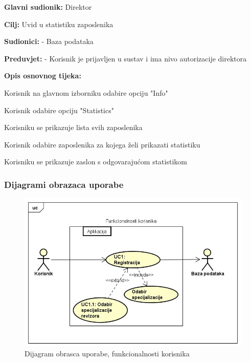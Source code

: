 					\noindent {}
						\begin{packed_item}
		
							\item \textbf{Glavni sudionik:} Direktor
							\item  \textbf{Cilj:} Uvid u statistiku zaposlenika
							\item  \textbf{Sudionici:} - Baza podataka
							\item  \textbf{Preduvjet:} - Korisnik je prijavljen u sustav i ima nivo autorizacije direktora
							\item  \textbf{Opis osnovnog tijeka:}
							
							\item[] \begin{packed_enum}
								\item Korisnik na glavnom izborniku odabire opciju "Info"
								\item Korisnik odabire opciju "Statistics"
								\item Korisniku se prikazuje lista svih zaposlenika
								\item Korisnik odabire zaposlenika za kojega želi prikazati statistiku
								\item Korisniku se prikazuje zaslon s odgovarajućom statistikom
							\end{packed_enum}
						\end{packed_item}
				\subsubsection{Dijagrami obrazaca uporabe}
				
				
				\begin{figure}[H]
					\includegraphics[scale=0.5]{slike/Funkcionalnosti korisnika} %
					\centering
					\caption{ Dijagram obrasca uporabe, funkcionalnosti korisnika}
					\label{fig:promjene}
				\end{figure}

